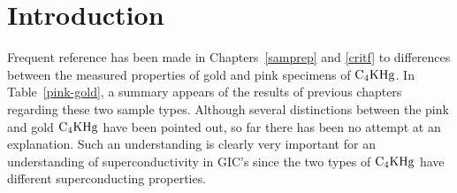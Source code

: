 \section{Introduction}
\label{hydintro}

        Frequent reference  has   been made  in Chapters~\ref{samprep}  and
\ref{critf} to differences between the measured properties of gold and pink
specimens of $\rm C_4KHg$.  In Table~\ref{pink-gold},  a summary appears of
the    results  of previous chapters   regarding   these  two sample types.
Although several distinctions between the pink  and gold $\rm  C_4KHg$ have
been pointed out,  so far  there has been no attempt  at  an  explanation.  Such  an
understanding  is  clearly    very   important  for  an   understanding  of
superconductivity in  GIC's  since  the   two types  of  $\rm C_4KHg$  have
different superconducting properties.

